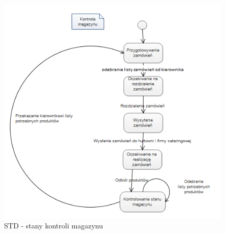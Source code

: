 \documentclass[a4paper, 11pt]{article}
\begin{document}
	\begin{figure}[H]%
		\includegraphics[scale=1.0]{Img/STD-kierownik3.png}
		\caption{STD - stany kontroli magazynu}
	\end{figure}
	
\end{document}
